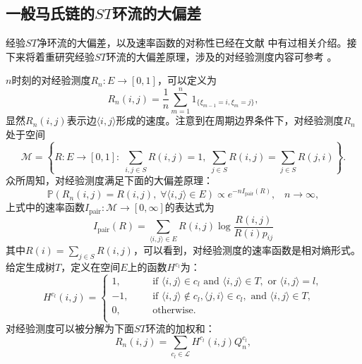 \subsection{一般马氏链的$ST$环流的大偏差}

经验$ST$净环流的大偏差，以及速率函数的对称性已经在文献 \cite{bertini2015flows} 中有过相关介绍。接下来将着重研究经验$ST$环流的大偏差原理，涉及的对经验测度内容可参考 \cite{den2008large}。

$n$时刻的对经验测度$R_n:E\rightarrow[0,1]$，可以定义为
\begin{equation*}
R_n(i,j) = \frac{1}{n}\sum_{m=1}^n1_{\{\xi_{m-1}=i,\xi_m=j\}},
\end{equation*}
显然$R_n(i,j)$表示边$\langle i,j\rangle$形成的速度。注意到在周期边界条件下，对经验测度$R_n$处于空间
\begin{equation*}
\mathcal{M} = \left\{R:E\rightarrow[0,1]:\;\sum_{i,j\in S}R(i,j) = 1,\;
\sum_{j\in S}R(i,j)=\sum_{j\in S}R(j,i)\right\}.
\end{equation*}
众所周知，对经验测度满足下面的大偏差原理：
\begin{equation*}
\mathbb{P}(R_n(i,j)=R(i,j),\;\forall\langle i,j\rangle\in E)\propto e^{-nI_{\mathrm{pair}}(R)},\;\;\;n\to\infty,
\end{equation*}
上式中的速率函数$I_{\mathrm{pair}}:\mathcal{M}\rightarrow[0,\infty]$的表达式为
\begin{equation*}
I_{\mathrm{pair}}(R) = \sum_{\langle i,j\rangle\in E}R(i,j)\log\frac{R(i,j)}{R(i)p_{ij}}
\end{equation*}
其中$R(i)=\sum_{j\in S}R(i,j)$，可以看到，对经验测度的速率函数是相对熵形式。给定生成树$T$，定义在空间$E$上的函数$H^{c_l}$为：
\begin{equation*}\label{cycle function2}
H^{c_l}(i,j)
    =\left\{\begin{aligned}
    1, &   && \text{if } \langle i,j\rangle \in c_l \text{ and }\langle i,j\rangle \in T, \text{ or } \langle i,j\rangle=l,\\
    -1,&   && \text{if } \langle i,j\rangle\notin c_l,\langle j,i\rangle \in c_l,\text{ and }\langle i,j\rangle \in T,\\
    0, &   && \text{otherwise}.\\
    \end{aligned}\right.
\end{equation*}
对经验测度可以被分解为下面$ST$环流的加权和：
\begin{equation*}
R_n(i,j) = \sum_{c_l\in\mathcal{L}}H^{c_l}(i,j)Q^{c_l}_n,
\end{equation*}
